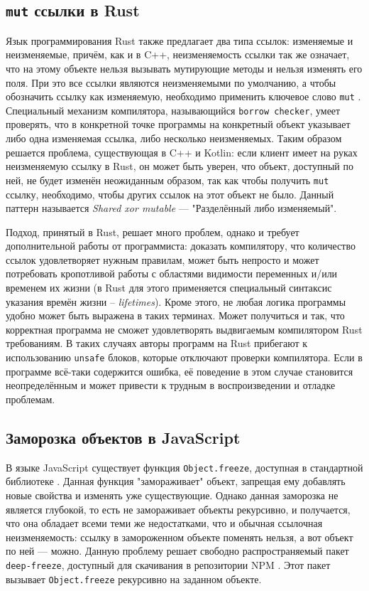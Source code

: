 \documentclass[specification,annotation,times]{itmo-student-thesis}
\begin{document}
\subsection{\texttt{mut} ссылки в Rust}

Язык программирования Rust \cite{rust-lang} также предлагает два типа ссылок: изменяемые и неизменяемые, причём, как и в C++, неизменяемость ссылки так же означает, что на этому объекте нельзя вызывать мутирующие методы и нельзя изменять его поля. При это все ссылки являются неизменяемыми по умолчанию, а чтобы обозначить ссылку как изменяемую, необходимо применить ключевое слово \texttt{mut} \cite{rust-mut}. 
Специальный механизм компилятора, называющийся \texttt{borrow checker}, умеет проверять, что в конкретной точке программы на конкретный объект указывает либо одна изменяемая ссылка, либо несколько неизменяемых.
Таким образом решается проблема, существующая в C++ и Kotlin: если клиент имеет на руках неизменяемую ссылку в Rust, он может быть уверен, что объект, доступный по ней, не будет изменён неожиданным образом, так как чтобы получить \texttt{mut} ссылку, необходимо, чтобы других ссылок на этот объект не было.
Данный паттерн называется \textit{Shared xor mutable} --- "Разделённый либо изменяемый".

Подход, принятый в Rust, решает много проблем, однако и требует дополнительной работы от программиста: доказать компилятору, что количество ссылок удовлетворяет нужным правилам, может быть непросто и может потребовать кропотливой работы с областями видимости переменных и/или временем их жизни (в Rust для этого применяется специальный синтаксис указания времён жизни -- \textit{lifetimes}).
Кроме этого, не любая логика программы удобно может быть выражена в таких терминах. Может получиться и так, что корректная программа не сможет удовлетворять выдвигаемым компилятором Rust требованиям.
В таких случаях авторы программ на Rust прибегают к использованию \texttt{unsafe} блоков, которые отключают проверки компилятора.
Если в программе всё-таки содержится ошибка, её поведение в этом случае становится неопределённым и может привести к трудным в воспроизведении и отладке проблемам.

\subsection{Заморозка объектов в JavaScript}\label{js_freeze}

В языке JavaScript существует функция \texttt{Object.freeze}, доступная в стандартной библиотеке \cite{EcmaScript}. Данная функция "замораживает" объект, запрещая ему добавлять новые свойства и изменять уже существующие.
Однако данная заморозка не является глубокой, то есть не замораживает объекты рекурсивно, и получается, что она обладает всеми теми же недостатками, что и обычная ссылочная неизменяемость: ссылку в замороженном объекте поменять нельзя, а вот объект по ней --- можно.
Данную проблему решает свободно распространяемый пакет \texttt{deep-freeze}, доступный для скачивания в репозитории NPM \cite{js-deep-freeze}. Этот пакет вызывает \texttt{Object.freeze} рекурсивно на заданном объекте.
\end{document}
